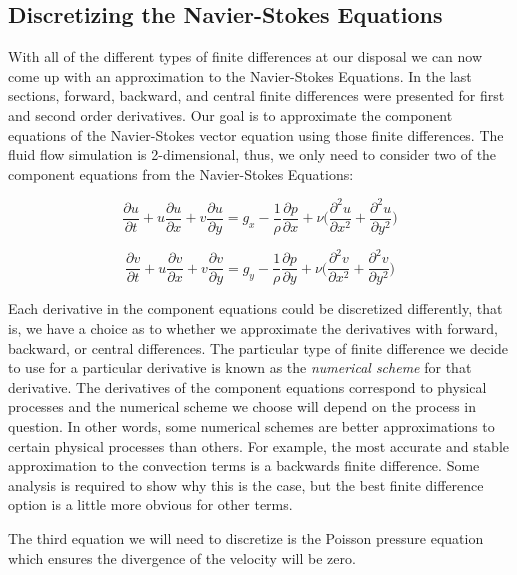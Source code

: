 \subsection{Discretizing the Navier-Stokes Equations}

With all of the different types of finite differences at our disposal we can now come up with an approximation to the Navier-Stokes Equations.
In the last sections, forward, backward, and central finite differences were presented for first and second order derivatives.
Our goal is to approximate the component equations of the Navier-Stokes vector equation using those finite differences.
The fluid flow simulation is 2-dimensional, thus, we only need to consider two of the component equations from the Navier-Stokes Equations:

\begin{equation}
\frac{\partial{u}}{\partial{t}} + u\frac{\partial{u}}{\partial{x}} + v\frac{\partial{u}}{\partial{y}} = g_x - \frac{1}{\rho}\frac{\partial{p}}{\partial{x}} + \nu \bigg( \frac{\partial^2u}{\partial{x}^2} + \frac{\partial^2u}{\partial{y}^2} \bigg)
\label{eq:exs1}
\end{equation}

\begin{equation*}
\frac{\partial{v}}{\partial{t}} + u\frac{\partial{v}}{\partial{x}} + v\frac{\partial{v}}{\partial{y}} = g_y -\frac{1}{\rho}\frac{\partial{p}}{\partial{y}} + \nu \bigg( \frac{\partial^2v}{\partial{x}^2} + \frac{\partial^2v}{\partial{y}^2} \bigg)
\end{equation*}

Each derivative in the component equations could be discretized differently, that is, we have a choice as to whether we approximate the derivatives with forward, backward, or central differences.
The particular type of finite difference we decide to use for a particular derivative is known as the \textit{numerical scheme} for that derivative.
The derivatives of the component equations correspond to physical processes and the numerical scheme we choose will depend on the process in question.
In other words, some numerical schemes are better approximations to certain physical processes than others.
For example, the most accurate and stable approximation to the convection terms is a backwards finite difference.
Some analysis is required to show why this is the case, but the best finite difference option is a little more obvious for other terms.


The third equation we will need to discretize is the Poisson pressure equation which ensures the divergence of the velocity will be zero.

